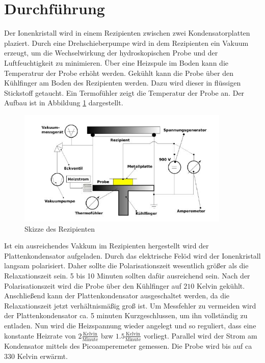 \section{Durchführung}
\label{sec:Durchführung}

Der Ionenkristall wird in einem Rezipienten zwischen zwei Kondensatorplatten plaziert.
Durch eine Drehschieberpumpe wird in dem Rezipienten ein Vakuum erzeugt,
um die Wechselwirkung der hydroskopischen Probe und der Luftfeuchtigkeit zu minimieren.
Über eine Heizspule im Boden kann die Temperatrur der Probe erhöht werden.
Gekühlt kann die Probe über den Kühlfinger am Boden des Rezipienten werden.
Dazu wird dieser in flüssigen Stickstoff getaucht.
Ein Termofühler zeigt die Temperatur der Probe an.
Der Aufbau ist in Abbildung \ref{abb:aufbau} dargestellt.
\begin{figure}[h] 
    \centering
    \includegraphics[width=0.9\textwidth]{abb/aufbau.JPG}
    \caption{Skizze des Rezipienten \cite{sample}}
    \label{abb:aufbau}
\end{figure}
Ist ein ausreichendes Vakkum im Rezipienten hergestellt wird der Plattenkondensator aufgeladen.
Durch das elektrische Felöd wird der Ionenkristall langsam polarisiert.
Daher sollte die Polarisationszeit wesentlich größer als die Relaxationszeit sein.
5 bis 10 Minuten sollten dafür ausreichend sein.
Nach der Polarisationszeit wird die Probe über den Kühlfinger auf $210$ Kelvin gekühlt.
Anschließend kann der Plattenkondensator ausgeschaltet werden,
da die Relaxationszeit jetzt verhältnismäßig groß ist.
Um Messfehler zu vermeiden wird der Plattenkondensator ca. 5 minuten Kurzgeschlussen, 
um ihn vollständig zu entladen.
Nun wird die Heizspannung wieder angelegt und so reguliert,
dass eine konstante Heizrate von $2 \frac{\text{Kelvin}}{\text{Minute}}$ bzw $1.5 \frac{\text{Kelvin}}{\text{Minute}}$ vorliegt.
Parallel wird der Strom am Kondensator mittels des Picoamperemeter gemessen.
Die Probe wird bis auf ca $330$ Kelvin erwärmt.
